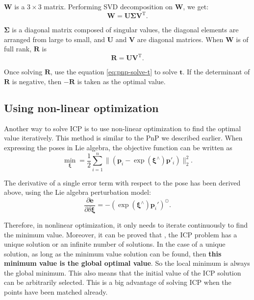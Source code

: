 $\bm{W}$ is a $3 \times 3$ matrix. Performing SVD decomposition on $\bm{W}$, we get:
\begin{equation}
\bm{W} = \bm{U \Sigma V}^\mathrm{T}.
\end{equation}

$\bm{\Sigma}$ is a diagonal matrix composed of singular values, the diagonal elements are arranged from large to small, and $\bm{U}$ and $\bm{V}$ are diagonal matrices. When $\bm{W}$ is of full rank, $\bm{R}$ is
\begin{equation}
\bm{R} = \bm{U} \bm{V}^\mathrm{T}.
\end{equation}

Once solving $\bm{R}$, use the equation \eqref{eq:pnp-solve-t} to solve $\bm{t}$. If the determinant of $\bm{R}$ is negative, then $-\bm{R}$ is taken as the optimal value.

\subsection{Using non-linear optimization}
Another way to solve ICP is to use non-linear optimization to find the optimal value iteratively. This method is similar to the PnP we described earlier. When expressing the poses in Lie algebra, the objective function can be written as
\begin{equation}
\mathop {\min }\limits_{\boldsymbol{\xi}} = \frac{1}{2} \sum\limits_{i = 1}^n\| {\left( {{{\bm{p}}_i} - \exp \left( \boldsymbol{\xi}^\wedge \right) {\bm{p}}'_i} \right)} \|^2_2.
\end{equation}

The derivative of a single error term with respect to the pose has been derived above, using the Lie algebra perturbation model:
\begin{equation}
\frac{{\partial \bm{e}}}{{\partial \delta \boldsymbol{\xi} }} =  - {\left( {\exp \left( {{ \boldsymbol{\xi} ^ \wedge }} \right){{\bm{p}}_i}'} \right)^ \odot }.
\end{equation}

Therefore, in nonlinear optimization, it only needs to iterate continuously to find the minimum value. Moreover, it can be proved that \textsuperscript{\cite{Barfoot2016}}, the ICP problem has a unique solution or an infinite number of solutions. In the case of a unique solution, as long as the minimum value solution can be found, then \textbf{this minimum value is the global optimal value}. So the local minimum is always the global minimum. This also means that the initial value of the ICP solution can be arbitrarily selected. This is a big advantage of solving ICP when the points have been matched already.

